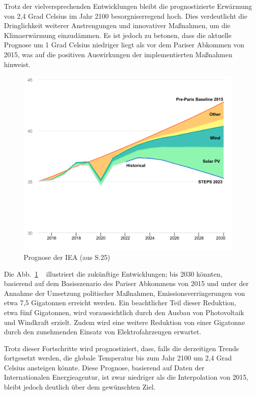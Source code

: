 \documentclass{article}
\begin{document}
Trotz der vielversprechenden Entwicklungen bleibt die prognostizierte Erwärmung von 2,4 Grad Celsius im Jahr 2100 besorgniserregend hoch. Dies verdeutlicht die Dringlichkeit weiterer Anstrengungen und innovativer Maßnahmen, um die Klimaerwärmung einzudämmen. Es ist jedoch zu betonen, dass die aktuelle Prognose um 1 Grad Celsius niedriger liegt als vor dem Pariser Abkommen von 2015, was auf die positiven Auswirkungen der implementierten Maßnahmen hinweist.
\newpage
\begin{figure}
		\includegraphics[width=1.00\textwidth]{../Figures/global-energy-sector-CO2-emissions-in-the-pre-paris-baseline-and-stated-policies-scenarios-2015-2030.png}
	\caption{Prognose der IEA (aus \cite{iea_net_zero2023PDF} S.25)
	\label{fig:global-energy-sector-CO2-emissions}}
\end{figure}
%
Die Abb.~\ref{fig:global-energy-sector-CO2-emissions} ~ illustriert die zukünftige Entwicklungen;  bis 2030 könnten, basierend auf dem Basisszenario des Pariser Abkommens von 2015 und unter der Annahme der Umsetzung politischer Maßnahmen, Emissionsverringerungen von etwa 7,5 Gigatonnen erreicht werden. Ein beachtlicher Teil dieser Reduktion, etwa fünf Gigatonnen, wird voraussichtlich durch den Ausbau von Photovoltaik und Windkraft erzielt. Zudem wird eine weitere Reduktion von einer Gigatonne durch den zunehmenden Einsatz von Elektrofahrzeugen erwartet.

Trotz dieser Fortschritte wird prognostiziert, dass, falls die derzeitigen Trends fortgesetzt werden, die globale Temperatur bis zum Jahr 2100 um 2,4 Grad Celsius ansteigen könnte. Diese Prognose, basierend auf Daten der Internationalen Energieagentur, ist zwar niedriger als die Interpolation von 2015, bleibt jedoch deutlich über dem gewünschten Ziel. 
\end{document}
